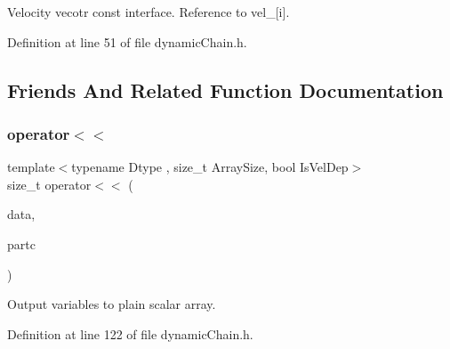 Velocity vecotr const interface. Reference to vel\+\_\+\mbox{[}i\mbox{]}. 



Definition at line 51 of file dynamic\+Chain.\+h.



\subsection{Friends And Related Function Documentation}
\mbox{\label{class_vel_indep_chain_particles_a2bd1a832e8f46ef461776d62d90965c4}} 
\subsubsection{\texorpdfstring{operator$<$$<$}{operator<<}}
{\footnotesize\ttfamily template$<$typename Dtype , size\+\_\+t Array\+Size, bool Is\+Vel\+Dep$>$ \\
size\+\_\+t operator$<$$<$ (\begin{DoxyParamCaption}\item[{\mbox{\hyperlink{class_vel_indep_particles_a6bba8ac3f941a144214037a27ccaa119}{Dyn\+Scalar\+Array}} \&}]{data,  }\item[{const \mbox{\hyperlink{class_vel_indep_chain_particles}{Vel\+Indep\+Chain\+Particles}}$<$ Dtype, Array\+Size, Is\+Vel\+Dep $>$ \&}]{partc }\end{DoxyParamCaption})\hspace{0.3cm}{\ttfamily [friend]}}



Output variables to plain scalar array. 



Definition at line 122 of file dynamic\+Chain.\+h.

\mbox{\label{class_vel_indep_chain_particles_a87208692311239cfefd6d58ea4ce39ce}} 
